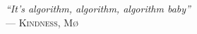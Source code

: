 \thispagestyle{empty}

\vspace*{0.32\textheight}

\begin{flushright}
	\begin{minipage}{0.68\linewidth}
		\raggedleft
		{\itshape\large ``It's algorithm, algorithm, algorithm baby''}\\[0.8em]
		--- \textsc{Kindness}, \textsc{Mø}
	\end{minipage}
\end{flushright}

\cleardoublepage
